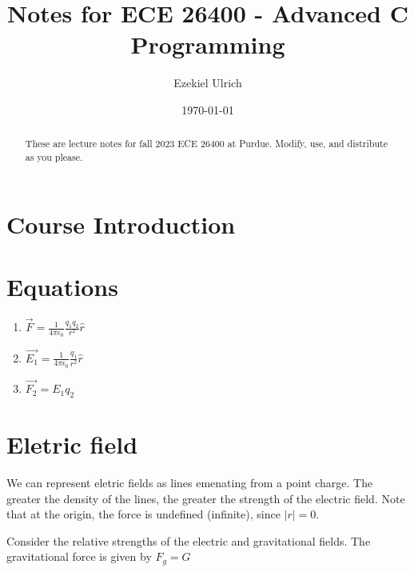 \documentclass[nobib]{tufte-handout}
\title{Notes for ECE 26400 - Advanced C Programming}
\author[Ezekiel Ulrich]{Ezekiel Ulrich}
\date{\today}  %
\begin{document}
\maketitle

\begin{abstract}
These are lecture notes for fall 2023 ECE 26400 at Purdue. Modify, use, and distribute as you please.
\end{abstract}

\tableofcontents

\section{Course Introduction}

\section{Equations}

\begin{enumerate}
    \item $\vec{F} = \frac{1}{4\pi \epsilon_0}\frac{q_1 q_2}{r^2}\hat{r}$
    \item $\vec{E_1} = \frac{1}{4\pi \epsilon_0}\frac{q_1}{r^2}\hat{r}$
    \item $\vec{F_2} = E_1 q_2$

\end{enumerate}

\section{Eletric field}

We can represent eletric fields as lines emenating from a point charge. The greater the density of the lines, the greater 
the strength of the electric field. Note that at the origin, the force is
undefined (infinite), since $|r| = 0$. 

Consider the relative strengths of the electric and 
gravitational fields. The gravitational force is given by
$F_g = G\frac{}{}$
\end{document}
